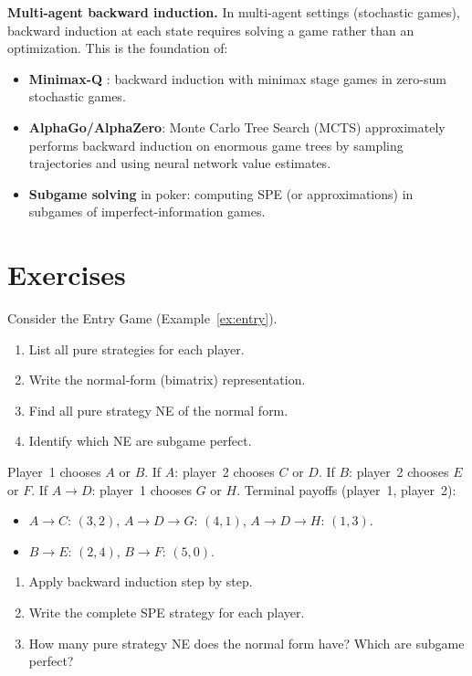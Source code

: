 \documentclass[11pt,a4paper]{article}
\begin{document}
\begin{rlconnection}
\textbf{Multi-agent backward induction.} In multi-agent settings (stochastic
games), backward induction at each state requires solving a game rather than
an optimization. This is the foundation of:
\begin{itemize}[nosep]
    \item \textbf{Minimax-Q} \citep{shoham2008}: backward induction with
    minimax stage games in zero-sum stochastic games.
    \item \textbf{AlphaGo/AlphaZero}: Monte Carlo Tree Search (MCTS)
    approximately performs backward induction on enormous game trees by
    sampling trajectories and using neural network value estimates.
    \item \textbf{Subgame solving} in poker: computing SPE (or
    approximations) in subgames of imperfect-information games.
\end{itemize}
\end{rlconnection}


\section{Exercises}
\label{sec:exercises}

\begin{exercise}
\label{ex:normal_form}
Consider the Entry Game (Example~\ref{ex:entry}).
\begin{enumerate}[nosep,label=(\alph*)]
    \item List all pure strategies for each player.
    \item Write the normal-form (bimatrix) representation.
    \item Find all pure strategy NE of the normal form.
    \item Identify which NE are subgame perfect.
\end{enumerate}
\end{exercise}

\begin{exercise}
\label{ex:three_stage}
Player~1 chooses $A$ or $B$. If $A$: player~2 chooses $C$ or $D$.
If $B$: player~2 chooses $E$ or $F$. If $A \to D$: player~1 chooses
$G$ or $H$. Terminal payoffs (player~1, player~2):
\begin{itemize}[nosep]
    \item $A \to C$: $(3,2)$, \quad $A \to D \to G$: $(4,1)$,
    \quad $A \to D \to H$: $(1,3)$.
    \item $B \to E$: $(2,4)$, \quad $B \to F$: $(5,0)$.
\end{itemize}
\begin{enumerate}[nosep,label=(\alph*)]
    \item Apply backward induction step by step.
    \item Write the complete SPE strategy for each player.
    \item How many pure strategy NE does the normal form have? Which are
    subgame perfect?
\end{enumerate}
\end{exercise}
\end{document}
